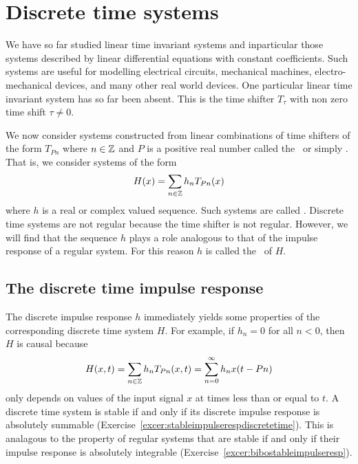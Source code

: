 \chapter{Discrete time systems} \label{cha:discr-time-syst}

We have so far studied linear time invariant systems and inparticular those systems described by linear differential equations with constant coefficients.  Such systems are useful for modelling electrical circuits, mechanical machines, electro-mechanical devices, and many other real world devices.  One particular linear time invariant system has so far been absent. This is the time shifter $T_\tau$ with non zero time shift $\tau \neq 0$.  %

We now consider systems constructed from linear combinations of time shifters of the form $T_{Pn}$ where $n \in {\mathbb Z}$ and $P$ is a positive real number called the~ or simply .  That is, we consider systems of the form
\[
H(x) = \sum_{n \in {\mathbb Z}} h_n T_{ P n}(x)
\]
where $h$ is a real or complex valued sequence.  Such systems are called .  Discrete time systems are not regular because the time shifter is not regular.  However, we will find that the sequence $h$ plays a role analogous to that of the impulse response of a regular system.  For this reason $h$ is called the~ of $H$.


\section{The discrete time impulse response} \label{sec:discr-time-impulse}

The discrete impulse response $h$ immediately yields some properties of the corresponding discrete time system $H$.  For example, if $h_n = 0$ for all $n < 0$, then $H$ is causal because 
\[
H(x,t) = \sum_{n \in {\mathbb Z}} h_n T_{ P n}(x,t) = \sum_{n =0}^\infty h_n x(t - Pn)
\] 
only depends on values of the input signal $x$ at times less than or equal to $t$.  A discrete time system is stable if and only if its discrete impulse response is absolutely summable (Exercise~\ref{excer:stableimpulserespdiscretetime}).  This is analagous to the property of regular systems that are stable if and only if their impulse response is absolutely integrable (Exercise~\ref{excer:bibostableimpulseresp}).

